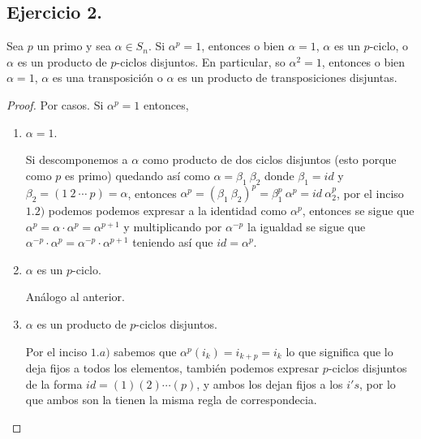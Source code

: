 \documentclass[11pt,letterpaper]{article}
\begin{document}
\subsection*{Ejercicio 2.}
Sea $p$ un primo y sea $\alpha \in S_n$. Si $\alpha^p = 1$, entonces o bien $\alpha = 1$, $\alpha$
es un $p$-ciclo, o $\alpha$ es un producto de $p$-ciclos disjuntos. En particular, so $\alpha^2 = 1$,
entonces o bien $\alpha = 1$, $\alpha$ es una transposición o $\alpha$ es un producto de transposiciones
disjuntas.
\begin{proof}
    Por casos. Si $\alpha^p = 1$ entonces,
    \begin{enumerate}
        \item $\alpha = 1$.
        
        Si descomponemos a $\alpha$ como producto de dos ciclos disjuntos (esto porque como $p$ es primo)
        quedando así como $\alpha = \beta_1 \ \beta_2$ donde $\beta_1 = id$ y $\beta_2 = (1 \ 2 \ \cdots \ p) = \alpha$,
        entonces $\alpha^p = (\beta_1 \ \beta_2)^p = \beta_1^p \ \alpha^p = id \ \alpha_2^p$, por el inciso $1.2)$ podemos
        podemos expresar a la identidad como $\alpha^p$, entonces se sigue que $\alpha^p = \alpha \cdot \alpha^p = \alpha^{p+1}$
        y multiplicando por $\alpha^{-p}$ la igualdad se sigue que $\alpha^{-p} \cdot \alpha^p = \alpha^{-p} \cdot \alpha^{p+1}$
        teniendo así que $id = \alpha^p$.

        \item $\alpha$ es un $p$-ciclo.
        
        Análogo al anterior.

        \item $\alpha$ es un producto de $p$-ciclos disjuntos.
        
        Por el inciso $1.a)$ sabemos que $\alpha^p(i_k) = i_{k+p} = i_k$ lo que significa que lo deja fijos
        a todos los elementos,
        también podemos expresar $p$-ciclos disjuntos de la forma $id = (1)(2)\cdots(p)$, y ambos los dejan fijos
        a los $i's$, por lo que ambos son la tienen la misma regla de correspondecia.
    \end{enumerate}
\end{proof}
\end{document}
